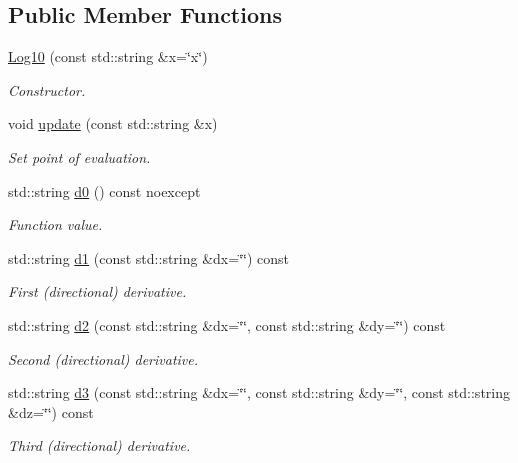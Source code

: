 \subsection*{Public Member Functions}
\begin{DoxyCompactItemize}
\item 
\hyperlink{structFunG_1_1stringify_1_1Log10_ac9c116740e7f9eac972dd9d8c1bae4a2}{Log10} (const std\-::string \&x=\char`\"{}x\char`\"{})
\begin{DoxyCompactList}\small\item\em Constructor. \end{DoxyCompactList}\item 
void \hyperlink{structFunG_1_1stringify_1_1Log10_a891be13cee4444f379ccc39425f42981}{update} (const std\-::string \&x)
\begin{DoxyCompactList}\small\item\em Set point of evaluation. \end{DoxyCompactList}\item 
std\-::string \hyperlink{structFunG_1_1stringify_1_1Log10_ad72e5992fac1dc95c150bb42b1449cff}{d0} () const noexcept
\begin{DoxyCompactList}\small\item\em Function value. \end{DoxyCompactList}\item 
std\-::string \hyperlink{structFunG_1_1stringify_1_1Log10_a691846f87fafe5bbf9eb60d3503bdc4e}{d1} (const std\-::string \&dx=\char`\"{}\char`\"{}) const 
\begin{DoxyCompactList}\small\item\em First (directional) derivative. \end{DoxyCompactList}\item 
std\-::string \hyperlink{structFunG_1_1stringify_1_1Log10_a01163482ea8ad8dddffe3fcf1bb5bb9c}{d2} (const std\-::string \&dx=\char`\"{}\char`\"{}, const std\-::string \&dy=\char`\"{}\char`\"{}) const 
\begin{DoxyCompactList}\small\item\em Second (directional) derivative. \end{DoxyCompactList}\item 
std\-::string \hyperlink{structFunG_1_1stringify_1_1Log10_ab77f394476f8f761e5c3a76e8767f7bb}{d3} (const std\-::string \&dx=\char`\"{}\char`\"{}, const std\-::string \&dy=\char`\"{}\char`\"{}, const std\-::string \&dz=\char`\"{}\char`\"{}) const 
\begin{DoxyCompactList}\small\item\em Third (directional) derivative. \end{DoxyCompactList}\end{DoxyCompactItemize}


